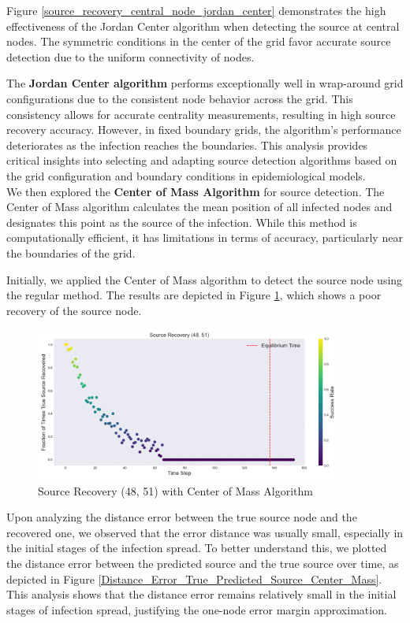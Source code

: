 Figure \ref{source_recovery_central_node_jordan_center} demonstrates the high effectiveness of the Jordan Center algorithm when detecting the source at central nodes. The symmetric conditions in the center of the grid favor accurate source detection due to the uniform connectivity of nodes.

The \textbf{Jordan Center algorithm} performs exceptionally well in wrap-around grid configurations due to the consistent node behavior across the grid. This consistency allows for accurate centrality measurements, resulting in high source recovery accuracy. However, in fixed boundary grids, the algorithm's performance deteriorates as the infection reaches the boundaries. This analysis provides critical insights into selecting and adapting source detection algorithms based on the grid configuration and boundary conditions in epidemiological models.\\

We then explored the \textbf{Center of Mass Algorithm} for source detection. The Center of Mass algorithm calculates the mean position of all infected nodes and designates this point as the source of the infection. While this method is computationally efficient, it has limitations in terms of accuracy, particularly near the boundaries of the grid.

Initially, we applied the Center of Mass algorithm to detect the source node using the regular method. The results are depicted in Figure \ref{source_recovery_48_51_Center_of_Mass}, which shows a poor recovery of the source node.

\begin{figure}[H]
\centering
\includegraphics[width=0.9\textwidth]{source_recovery_48_51_Center_of_Mass.png}
\caption{Source Recovery (48, 51) with Center of Mass Algorithm}
\label{source_recovery_48_51_Center_of_Mass}
\end{figure}

Upon analyzing the distance error between the true source node and the recovered one, we observed that the error distance was usually small, especially in the initial stages of the infection spread. To better understand this, we plotted the distance error between the predicted source and the true source over time, as depicted in Figure \ref{Distance_Error_True_Predicted_Source_Center_Mass}. This analysis shows that the distance error remains relatively small in the initial stages of infection spread, justifying the one-node error margin approximation.

